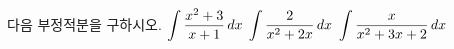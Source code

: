 다음 부정적분을 구하시오.
 $\displaystyle\int\dfrac{x^2+3}{x+1}\mkern3mu dx$
 $\displaystyle\int\dfrac{2}{x^2+2x}\mkern3mu dx$
 $\displaystyle\int\dfrac{x}{x^2+3x+2}\mkern3mu dx$
